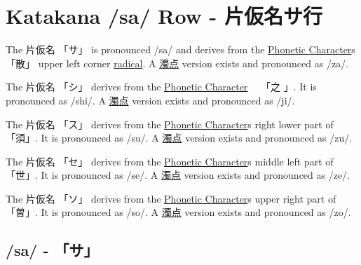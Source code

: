 \section{Katakana /sa/ Row - 片仮名サ行}\label{sec:KatakanaSaRow}


\label{letter:sa} The  片仮名 {「サ」} is pronounced  /sa/ and
derives from the \hyperref[sec:PhoneticCharacter]{Phonetic Character}s {「散」}
upper left corner \hyperref[sec:Radical]{radical}.  A
\hyperref[sec:Dakuten]{濁点} version exists and pronounced as /za/.

\label{letter:shi} The 片仮名 {「シ」} derives from the
\hyperref[sec:PhoneticCharacter]{Phonetic Character}　 {「之 」}.  It is
pronounced as /shi/.  A \hyperref[sec:Dakuten]{濁点} version exists and
pronounced as /ji/.


\label{letter:su} The 片仮名 {「ス」} derives from the
\hyperref[sec:PhoneticCharacter]{Phonetic Character}s right lower part of
{「須」}.  It is pronounced as /su/.  A \hyperref[sec:Dakuten]{濁点} version
exists and pronounced as /zu/. 

\label{letter:se} The 片仮名 {「セ」} derives from the
\hyperref[sec:PhoneticCharacter]{Phonetic Character}s middle left part of
{「世」}.  It is pronounced as /se/.  A \hyperref[sec:Dakuten]{濁点} version
exists and pronounced as /ze/.  

\newpage

\label{letter:so} The 片仮名 {「ソ」} derives from the
\hyperref[sec:PhoneticCharacter]{Phonetic Character}s upper right part of
{「曽」}.  It is pronounced as /so/.  A \hyperref[sec:Dakuten]{濁点} version
exists and pronounced as /zo/.



\newpage
\subsection{/sa/ - 「サ」}\label{sec:KatakanaSa}


